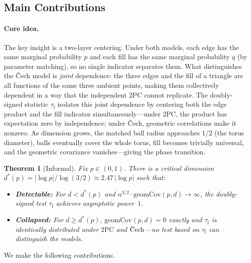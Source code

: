 \documentclass[reqno,12pt]{amsart}
\newcommand{\tauf}{\tau_{\mathrm{f}}}
\newcommand{\PC}{\mathrm{2PC}}
\newcommand{\Cech}{\ifmmode\text{\v{C}ech}\else\v{C}ech\fi}  %
\newcommand{\geomCov}{\mathrm{geomCov}}
\theoremstyle{plain}
\newtheorem{theorem}{Theorem}[section]
\theoremstyle{definition}
\theoremstyle{remark}
\begin{document}
\subsection{Main Contributions}

\paragraph{Core idea.}
The key insight is a two-layer centering. Under both models, each edge has the same marginal
probability $p$ and each fill has the same marginal probability $q$ (by parameter matching),
so no single indicator separates them. What distinguishes the \v{C}ech model is
\emph{joint} dependence: the three edges and the fill of a triangle are all functions of the
same three ambient points, making them collectively dependent in a way that the independent
2PC cannot replicate. The doubly-signed statistic $\tauf$ isolates this joint dependence by
centering both the edge product and the fill indicator simultaneously---under 2PC, the
product has expectation zero by independence; under \v{C}ech, geometric correlations make it
nonzero. As dimension grows, the matched ball radius approaches $1/2$ (the torus diameter),
balls eventually cover the whole torus, fill becomes trivially universal, and the geometric
covariance vanishes---giving the phase transition.

\begin{theorem}[Informal]\label{thm:informal}
Fix $p\in(0,1)$. There is a critical dimension
$d^*(p) = |\log p|/\log(3/2) \approx 2.47\,|\log p|$ such that:
\begin{itemize}
  \item \textbf{Detectable:} For $d < d^*(p)$ and $n^{3/2}\cdot\geomCov(p,d)\to\infty$,
    the doubly-signed test $\tauf$ achieves asymptotic power~$1$.
  \item \textbf{Collapsed:} For $d \geq d^*(p)$, $\geomCov(p,d) = 0$ exactly and
    $\tauf$ is identically distributed under $\PC$ and $\Cech$---no test based on
    $\tauf$ can distinguish the models.
\end{itemize}
\end{theorem}

We make the following contributions.
\end{document}
